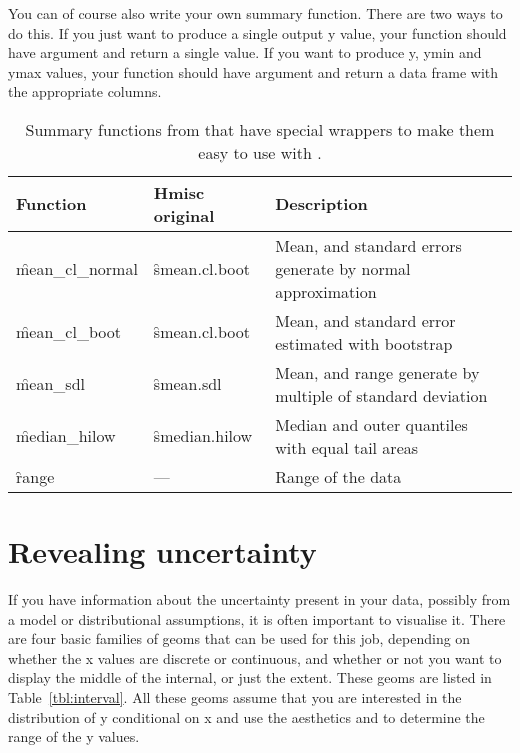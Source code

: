 You can of course also write your own summary function.  There are two ways to do this.  If you just want to produce a single output y value, your function should have argument  and return a single value.  If you want to produce y, ymin and ymax values, your function should have argument  and return a data frame with the appropriate columns.

\begin{table}
  \begin{center}
  \begin{tabular}{llp{2in}}
    \toprule
    Function & Hmisc original & Description \\
    \midrule 
    \f{mean_cl_normal} & \f{smean.cl.boot} & 
      Mean, and standard errors generate by normal approximation \\
    \f{mean_cl_boot} & \f{smean.cl.boot} & 
      Mean, and standard error estimated with bootstrap \\
    \f{mean_sdl} & \f{smean.sdl} & 
      Mean, and range generate by multiple of standard deviation  \\
    \f{median_hilow} & \f{smedian.hilow}  & 
      Median and outer quantiles with equal tail areas \\
    \f{range} & --- & 
      Range of the data\\
    \bottomrule
  \end{tabular}
  \end{center}
  \caption{Summary functions from  that have special wrappers to make them easy to use with .}
  \label{tbl:hmisc}
\end{table}


\section{Revealing uncertainty}
\label{sec:uncertainty}

If you have information about the uncertainty present in your data, possibly from a model or distributional assumptions, it is often important to visualise it.  There are four basic families of geoms that can be used for this job, depending on whether the x values are discrete or continuous, and whether or not you want to display the middle of the internal, or just the extent.  These geoms are listed in Table~\ref{tbl:interval}.  All these geoms assume that you are interested in the distribution of y conditional on x and use the aesthetics  and  to determine the range of the y values.


